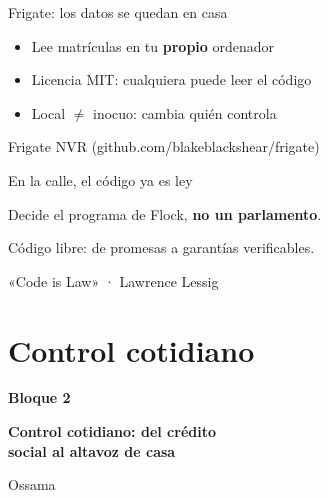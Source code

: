 \documentclass[aspectratio=169,12pt]{beamer}
\def\navprev{}
\def\navnext{}
\newcommand{\nav}[2]{\gdef\navprev{#1}\gdef\navnext{#2}}
\newcommand{\bloque}[3]{%
  \begin{frame}[plain]
    \vfill
    \begin{center}
      {\color{terra}\large\bfseries Bloque #1}\\[0.3cm]
      {\color{azul}\LARGE\bfseries #2\par}\vspace{0.5cm}
      {\large #3}
    \end{center}
    \vfill
  \end{frame}}
\newcommand{\fuente}[1]{\vfill{\small\color{gris}#1\par}}
\begin{document}
\nav{DeFlock}{Cierre}
\begin{frame}{Frigate: los datos se quedan en casa}
  \begin{itemize}
    \item Lee matrículas en tu \textbf{propio} ordenador
    \item Licencia MIT: cualquiera puede leer el código
    \item Local $\neq$ inocuo: cambia quién controla
  \end{itemize}
  \fuente{Frigate NVR (github.com/blakeblackshear/frigate)}
\end{frame}

\nav{Frigate}{}
\begin{frame}{En la calle, el código ya es ley}
  \vspace{0.3cm}
  {\Large Decide el programa de Flock, \alert{\textbf{no un parlamento}}.\par}
  \vspace{0.8cm}
  {\Large Código libre: de promesas a garantías verificables.\par}
  \fuente{«Code is Law» · Lawrence Lessig}
\end{frame}
\section{Control cotidiano}
\nav{}{}
\bloque{2}{Control cotidiano: del crédito\\social al altavoz de casa}{Ossama}

\newcommand{\cifram}[2]{%
  \begin{center}
    {\color{terra}\fontsize{26}{30}\selectfont\bfseries #1}\\[0.15cm]
    {\normalsize #2}
  \end{center}}
\end{document}
